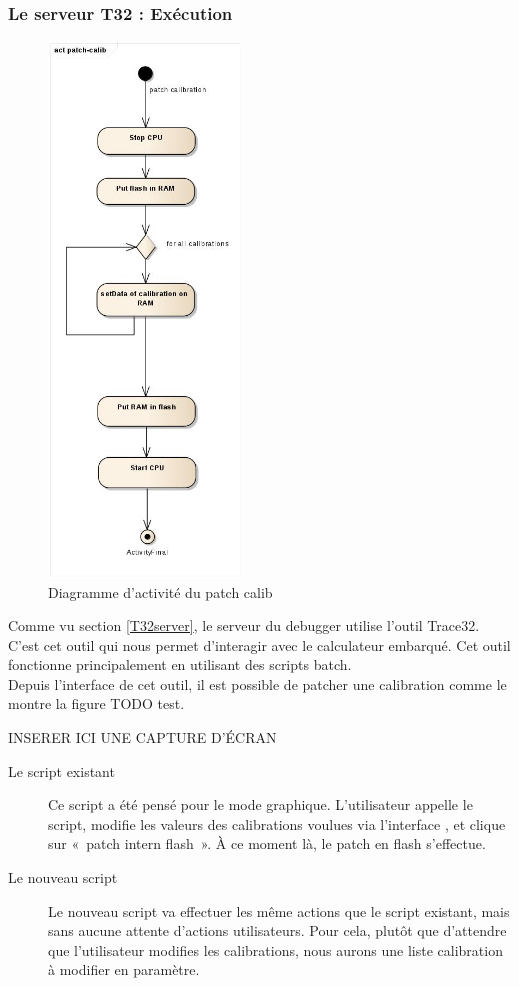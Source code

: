 	\subsubsection{Le serveur T32 : Exécution}
		\begin{figure}
			\vspace{-65px}
			\includegraphics[height=14.2cm]{contents/images/script_activite.jpg}
			\caption{Diagramme d'activité du patch calib}
			\label{fig:scriptBatch} 
						\vspace{-3cm}
		\end{figure}
	Comme vu section \ref{T32server}, le serveur du debugger utilise l'outil Trace32. C'est cet outil qui nous permet d’interagir avec le calculateur embarqué. Cet outil fonctionne principalement en utilisant des scripts batch.\\
	Depuis l'interface de cet outil, il est possible de patcher une calibration comme le montre la figure TODO test.
	
	 INSERER ICI UNE CAPTURE D'ÉCRAN

	\begin{description}
		\item[Le script existant] Ce script a été pensé pour le mode graphique. L'utilisateur appelle le script, modifie les valeurs des calibrations voulues via l'interface , et clique sur «~patch intern flash~». À ce moment là, le patch en flash s'effectue.
		\item[Le nouveau script] Le nouveau script va effectuer les même actions que le script existant, mais sans aucune attente d'actions utilisateurs. Pour cela, plutôt que d'attendre que l'utilisateur modifies les calibrations, nous aurons une liste calibration à modifier en paramètre.
	\end{description}

